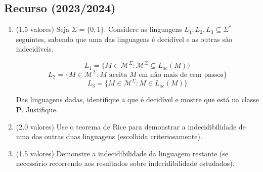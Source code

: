 \documentclass[a4paper,12pt]{article}
\begin{document}
\vspace{1.0cm}
\subsection*{Recurso (2023/2024)}
\begin{enumerate}[label=\alph*)]
  \item (1.5 valores) Seja \(\Sigma = \{0, 1\}\). Considere as linguagens \(L_1, L_2, L_3 \subseteq \Sigma^*\) seguintes, sabendo que uma das linguagens é decidível e as outras são indecidíveis.

  \[L_1 = \{M \in \mathcal{M}^{\Sigma} : \mathcal{M}^{\Sigma} \subseteq L_{ac}(M)\}\]
  \[L_2 = \{M \in \mathcal{M}^{\Sigma} : M \text{ aceita } M \text{ em não mais de cem passos}\}\]
  \[L_3 = \{M \in \mathcal{M}^{\Sigma} : M \in L_{ac}(M)\}\]
  
  Das linguagens dadas, identifique a que é decidível e mostre que está na classe \textbf{P}. Justifique.

  \item (2.0 valores) Use o teorema de Rice para demonstrar a indecidibilidade de uma das outras duas linguagens (escolhida criteriosamente).

  \item (1.5 valores) Demonstre a indecidibilidade da linguagem restante (se necessário recorrendo aos resultados sobre indecidibilidade estudados).
\end{enumerate}
\end{document}
